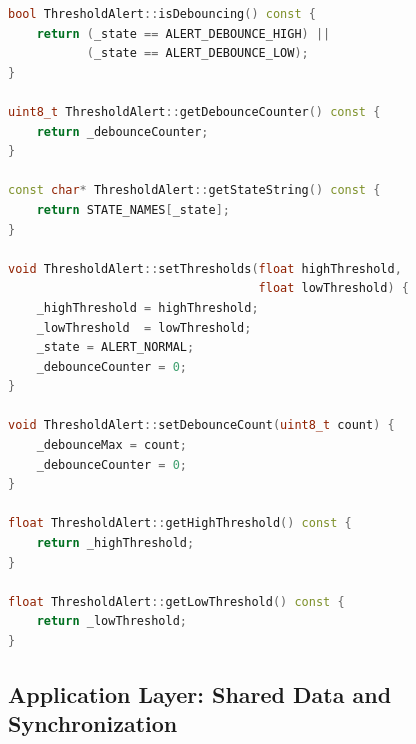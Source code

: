 \begin{lstlisting}[language=C++, caption=ThresholdAlert.cpp --- Hysteresis-Based Threshold Alert Implementation]
bool ThresholdAlert::isDebouncing() const {
    return (_state == ALERT_DEBOUNCE_HIGH) ||
           (_state == ALERT_DEBOUNCE_LOW);
}

uint8_t ThresholdAlert::getDebounceCounter() const {
    return _debounceCounter;
}

const char* ThresholdAlert::getStateString() const {
    return STATE_NAMES[_state];
}

void ThresholdAlert::setThresholds(float highThreshold,
                                   float lowThreshold) {
    _highThreshold = highThreshold;
    _lowThreshold  = lowThreshold;
    _state = ALERT_NORMAL;
    _debounceCounter = 0;
}

void ThresholdAlert::setDebounceCount(uint8_t count) {
    _debounceMax = count;
    _debounceCounter = 0;
}

float ThresholdAlert::getHighThreshold() const {
    return _highThreshold;
}

float ThresholdAlert::getLowThreshold() const {
    return _lowThreshold;
}
\end{lstlisting}


\subsection{Application Layer: Shared Data and Synchronization}

